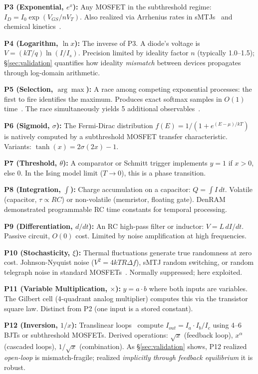 \documentclass[11pt]{article}
\begin{document}
\textbf{P3 (Exponential, $e^x$):} Any MOSFET in the subthreshold regime: $I_D = I_0 \exp(V_{GS}/nV_T)$. Also realized via Arrhenius rates in sMTJs~\cite{bieg2026sba} and chemical kinetics~\cite{bieg2026}.

\textbf{P4 (Logarithm, $\ln x$):} The inverse of P3. A diode's voltage is $V = (kT/q)\ln(I/I_s)$. Precision limited by ideality factor $n$ (typically 1.0--1.5); \S\ref{sec:validation} quantifies how ideality \textit{mismatch} between devices propagates through log-domain arithmetic.

\textbf{P5 (Selection, $\arg\max$):} A race among competing exponential processes: the first to fire identifies the maximum. Produces exact softmax samples in $O(1)$ time~\cite{bieg2026sba}. The race simultaneously yields 5 additional observables~\cite{bieg2026}.

\textbf{P6 (Sigmoid, $\sigma$):} The Fermi-Dirac distribution $f(E) = 1/(1 + e^{(E-\mu)/kT})$ is natively computed by a subthreshold MOSFET transfer characteristic. Variants: $\tanh(x) = 2\sigma(2x) - 1$.

\textbf{P7 (Threshold, $\theta$):} A comparator or Schmitt trigger implements $y = 1$ if $x > 0$, else $0$. In the Ising model limit ($T \to 0$), this is a phase transition.

\textbf{P8 (Integration, $\int$):} Charge accumulation on a capacitor: $Q = \int I\,dt$. Volatile (capacitor, $\tau \propto RC$) or non-volatile (memristor, floating gate). DenRAM~\cite{denram2024} demonstrated programmable RC time constants for temporal processing.

\textbf{P9 (Differentiation, $d/dt$):} An RC high-pass filter or inductor: $V = L\,dI/dt$. Passive circuit, $O(0)$ cost. Limited by noise amplification at high frequencies.

\textbf{P10 (Stochasticity, $\xi$):} Thermal fluctuations generate true randomness at zero cost. Johnson-Nyquist noise ($V^2 = 4kTR\Delta f$), sMTJ random switching, or random telegraph noise in standard MOSFETs~\cite{cryptoristor2024}. Normally suppressed; here exploited.

\textbf{P11 (Variable Multiplication, $\times$):} $y = a \cdot b$ where both inputs are variables. The Gilbert cell (4-quadrant analog multiplier) computes this via the transistor square law. Distinct from P2 (one input is a stored constant).

\textbf{P12 (Inversion, $1/x$):} Translinear loops~\cite{gilbert1975} compute $I_{out} = I_a \cdot I_b / I_c$ using 4--6 BJTs or subthreshold MOSFETs. Derived operations: $\sqrt{x}$ (feedback loop), $x^\alpha$ (cascaded loops), $1/\sqrt{x}$ (combination). As \S\ref{sec:validation} shows, P12 realized \textit{open-loop} is mismatch-fragile; realized \textit{implicitly through feedback equilibrium} it is robust.
\end{document}
